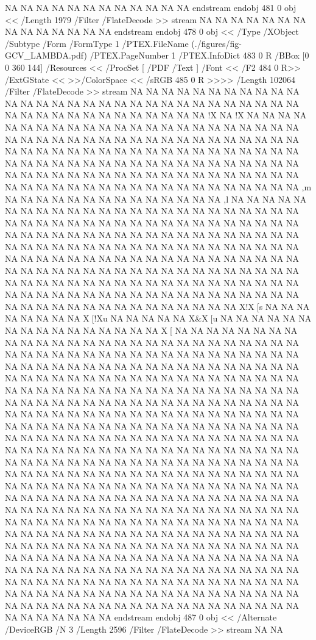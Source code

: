 {NA
NA
NA
NA
NA
NA
NA
NA
NA
NA
NA
NA
endstream
endobj
481 0 obj <<
/Length 1979      
/Filter /FlateDecode
>>
stream
NA
NA
NA
NA
NA
NA
NA
NA
NA
NA
NA
NA
NA
NA
endstream
endobj
478 0 obj <<
/Type /XObject
/Subtype /Form
/FormType 1
/PTEX.FileName (./figures/fig-GCV_LAMBDA.pdf)
/PTEX.PageNumber 1
/PTEX.InfoDict 483 0 R
/BBox [0 0 360 144]
/Resources <<
/ProcSet [ /PDF /Text ]
/Font << /F2 484 0 R>>
/ExtGState <<
>>/ColorSpace <<
/sRGB 485 0 R
>>>>
/Length 102064
/Filter /FlateDecode
>>
stream
NA
NA
NA
NA
NA
NA
NA
NA
NA
NA
NA
NA
NA
NA
NA
NA
NA
NA
NA
NA
NA
NA
NA
NA
NA
NA
NA
NA
NA
NA
NA
NA
NA
NA
NA
NA
NA
NA
NA
NA
NA
NA
NA
!X
NA
!X
NA
NA
NA
NA
NA
NA
NA
NA
NA
NA
NA
NA
NA
NA
NA
NA
NA
NA
NA
NA
NA
NA
NA
NA
NA
NA
NA
NA
NA
NA
NA
NA
NA
NA
NA
NA
NA
NA
NA
NA
NA
NA
NA
NA
NA
NA
NA
NA
NA
NA
NA
NA
NA
NA
NA
NA
NA
NA
NA
NA
NA
NA
NA
NA
NA
NA
NA
NA
NA
NA
NA
NA
NA
NA
NA
NA
NA
NA
NA
NA
NA
NA
NA
NA
NA
NA
NA
NA
NA
NA
NA
NA
NA
NA
NA
NA
NA
NA
NA
NA
NA
NA
NA
NA
NA
NA
NA
NA
NA
NA
NA
NA
NA
NA
NA
NA
NA
NA
,m
NA
NA
NA
NA
NA
NA
NA
NA
NA
NA
NA
NA
NA
NA
,l
NA
NA
NA
NA
NA
NA
NA
NA
NA
NA
NA
NA
NA
NA
NA
NA
NA
NA
NA
NA
NA
NA
NA
NA
NA
NA
NA
NA
NA
NA
NA
NA
NA
NA
NA
NA
NA
NA
NA
NA
NA
NA
NA
NA
NA
NA
NA
NA
NA
NA
NA
NA
NA
NA
NA
NA
NA
NA
NA
NA
NA
NA
NA
NA
NA
NA
NA
NA
NA
NA
NA
NA
NA
NA
NA
NA
NA
NA
NA
NA
NA
NA
NA
NA
NA
NA
NA
NA
NA
NA
NA
NA
NA
NA
NA
NA
NA
NA
NA
NA
NA
NA
NA
NA
NA
NA
NA
NA
NA
NA
NA
NA
NA
NA
NA
NA
NA
NA
NA
NA
NA
NA
NA
NA
NA
NA
NA
NA
NA
NA
NA
NA
NA
NA
NA
NA
NA
NA
NA
NA
NA
NA
NA
NA
NA
NA
NA
NA
NA
NA
NA
NA
NA
NA
NA
NA
NA
NA
NA
NA
NA
NA
NA
NA
NA
NA
NA
NA
NA
NA
NA
NA
X!X[s
NA
NA
NA
NA
NA
NA
NA
NA
X[!Xu
NA
NA
NA
NA
NA
X&X[u
NA
NA
NA
NA
NA
NA
NA
NA
NA
NA
NA
NA
NA
NA
NA
NA
X[%
NA
NA
NA
NA
NA
NA
NA
NA
NA
NA
NA
NA
NA
NA
NA
NA
NA
NA
NA
NA
NA
NA
NA
NA
NA
NA
NA
NA
NA
NA
NA
NA
NA
NA
NA
NA
NA
NA
NA
NA
NA
NA
NA
NA
NA
NA
NA
NA
NA
NA
NA
NA
NA
NA
NA
NA
NA
NA
NA
NA
NA
NA
NA
NA
NA
NA
NA
NA
NA
NA
NA
NA
NA
NA
NA
NA
NA
NA
NA
NA
NA
NA
NA
NA
NA
NA
NA
NA
NA
NA
NA
NA
NA
NA
NA
NA
NA
NA
NA
NA
NA
NA
NA
NA
NA
NA
NA
NA
NA
NA
NA
NA
NA
NA
NA
NA
NA
NA
NA
NA
NA
NA
NA
NA
NA
NA
NA
NA
NA
NA
NA
NA
NA
NA
NA
NA
NA
NA
NA
NA
NA
NA
NA
NA
NA
NA
NA
NA
NA
NA
NA
NA
NA
NA
NA
NA
NA
NA
NA
NA
NA
NA
NA
NA
NA
NA
NA
NA
NA
NA
NA
NA
NA
NA
NA
NA
NA
NA
NA
NA
NA
NA
NA
NA
NA
NA
NA
NA
NA
NA
NA
NA
NA
NA
NA
NA
NA
NA
NA
NA
NA
NA
NA
NA
NA
NA
NA
NA
NA
NA
NA
NA
NA
NA
NA
NA
NA
NA
NA
NA
NA
NA
NA
NA
NA
NA
NA
NA
NA
NA
NA
NA
NA
NA
NA
NA
NA
NA
NA
NA
NA
NA
NA
NA
NA
NA
NA
NA
NA
NA
NA
NA
NA
NA
NA
NA
NA
NA
NA
NA
NA
NA
NA
NA
NA
NA
NA
NA
NA
NA
NA
NA
NA
NA
NA
NA
NA
NA
NA
NA
NA
NA
NA
NA
NA
NA
NA
NA
NA
NA
NA
NA
NA
NA
NA
NA
NA
NA
NA
NA
NA
NA
NA
NA
NA
NA
NA
NA
NA
NA
NA
NA
NA
NA
NA
NA
NA
NA
NA
NA
NA
NA
NA
NA
NA
NA
NA
NA
NA
NA
NA
NA
NA
NA
NA
NA
NA
NA
NA
NA
NA
NA
NA
NA
NA
NA
NA
NA
NA
NA
NA
NA
NA
NA
NA
NA
NA
NA
NA
NA
NA
NA
NA
NA
NA
NA
NA
NA
NA
NA
NA
NA
NA
NA
NA
NA
NA
NA
NA
NA
NA
NA
NA
NA
NA
NA
NA
NA
NA
NA
NA
NA
NA
NA
NA
NA
NA
NA
NA
NA
NA
NA
NA
NA
NA
NA
NA
NA
NA
NA
NA
NA
NA
NA
NA
NA
NA
NA
NA
NA
NA
NA
NA
NA
NA
NA
NA
NA
NA
NA
NA
NA
NA
NA
NA
NA
NA
NA
NA
NA
NA
NA
NA
NA
NA
NA
NA
NA
NA
NA
NA
NA
endstream
endobj
487 0 obj
<<
/Alternate /DeviceRGB
/N 3
/Length 2596
/Filter /FlateDecode
>>
stream
NA
NA

}
